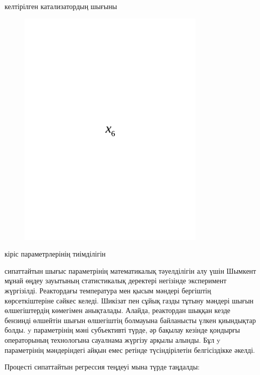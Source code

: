 келтірілген катализатордың шығыны
\begin{figure}[H]
	\centering
	\includegraphics[width=0.8\textwidth]{media/ict/image92}
	\caption*{}
\end{figure}

кіріс параметрлерінің тиімділігін

сипаттайтын шығыс параметрінің математикалық тәуелділігін алу үшін
Шымкент мұнай өңдеу зауытының статистикалық деректері негізінде
эксперимент жүргізілді. Реактордағы температура мен қысым мәндері
бергіштің көрсеткіштеріне сәйкес келеді. Шикізат пен сұйық газды тұтыну
мәндері шығын өлшегіштердің көмегімен анықталады. Алайда, реактордан
шыққан кезде бензинді өлшейтін шығын өлшегіштің болмауына байланысты
үлкен қиындықтар болды. y параметрінің мәні субъективті түрде, әр
бақылау кезінде қондырғы операторының технологына сауалнама жүргізу
арқылы алынды. Бұл y параметрінің мәндеріндегі айқын емес ретінде
түсіндірілетін белгісіздікке әкелді.

Процесті сипаттайтын регрессия теңдеуі мына түрде таңдалды:

